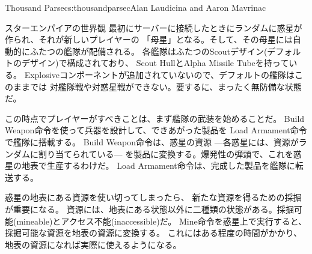 \begin{aosachapter}{Thousand Parsec}{s:thousandparsec}{Alan Laudicina and Aaron Mavrinac}
\begin{aosasect1}{スターエンパイアの世界観}
最初にサーバーに接続したときにランダムに惑星が作られ、それが新しいプレイヤーの
「母星」となる。そして、その母星には自動的にふたつの艦隊が配備される。
各艦隊はふたつのScoutデザイン(デフォルトのデザイン)で構成されており、
Scout HullとAlpha Missile Tubeを持っている。
Explosiveコンポーネントが追加されていないので、デフォルトの艦隊はこのままでは
対艦隊戦や対惑星戦ができない。要するに、まったく無防備な状態だ。


この時点でプレイヤーがすべきことは、まず艦隊の武装を始めることだ。
Build Weapon命令を使って兵器を設計して、できあがった製品を
Load Armament命令で艦隊に搭載する。
Build Weapon命令は、惑星の資源
---各惑星には、資源がランダムに割り当てられている---
を製品に変換する。爆発性の弾頭で、これを惑星の地表で生産するわけだ。
Load Armament命令は、完成した製品を艦隊に転送する。

惑星の地表にある資源を使い切ってしまったら、
新たな資源を得るための採掘が重要になる。
資源には、地表にある状態以外に二種類の状態がある。採掘可能(mineable)とアクセス不能(inaccessible)だ。
Mine命令を惑星上で実行すると、採掘可能な資源を地表の資源に変換する。
これにはある程度の時間がかかり、地表の資源になれば実際に使えるようになる。


\end{aosasect1}
\end{aosachapter}
